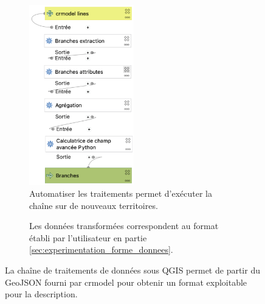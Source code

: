\begin{figure}[ht]
    \centering
    \begin{subfigure}[t]{.49\linewidth}
        \centering
        \includegraphics[width=0.5\textwidth]{images/experimentation/pipeline_processing_crmodel.png}
        \caption{Automatiser les traitements permet d'exécuter la chaîne sur de nouveaux territoires.}
        \label{fig:experimentation_transformation_qgis}
    \end{subfigure}
    \hfill
    \begin{subfigure}[t]{.49\linewidth}
        \centering
        \caption{Les données transformées correspondent au format établi par l'utilisateur en partie \ref{sec:experimentation_forme_donnees}.}
        \label{fig:experimentation_transformation_resultat_qgis}
    \end{subfigure}
    \caption[Chaîne de traitement de données sous QGIS]{La chaîne de traitements de données sous QGIS permet de partir du GeoJSON fourni par crmodel pour obtenir un format exploitable pour la description.}
    \label{fig:experimentation_chaine_donnees_qgis}
\end{figure}

